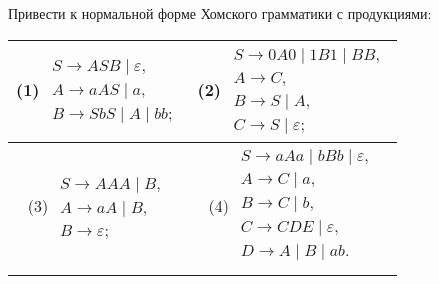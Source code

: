 \begin{Task} 
Привести к нормальной форме Хомского грамматики с продукциями:

\begin{tabular}{c|c} 
    (1) $\begin{array}{l}
    S \to ASB \mid \varepsilon,\\
    A \to aAS \mid a,\\
    B \to SbS \mid A \mid bb;
    \end{array}$&
    (2) $\begin{array}{l}
    S \to 0A0 \mid 1B1 \mid BB,\\
    A \to C,\\
    B \to S \mid A,\\
    C \to S \mid \varepsilon;
    \end{array}$\\[\bigskipamount] \hline
    (3) $\begin{array}{l}
    S \to AAA \mid B,\\
    A \to aA \mid B,\\
    B \to \varepsilon;
    \end{array}$ &
    (4) $\begin{array}{l}
    S \to aAa \mid bBb \mid \varepsilon,\\
    A \to C \mid a,\\
    B \to C \mid b,\\
    C \to CDE \mid \varepsilon,\\
    D \to A \mid B \mid ab.\\
    \end{array}$
\end{tabular}
\end{Task}